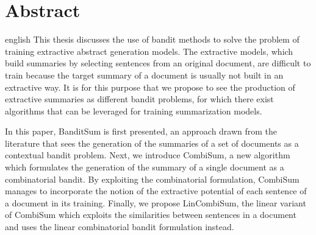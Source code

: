 \chapter*{Abstract}             %
\label{chap:abstract}           %

\begin{otherlanguage*}{english}
This thesis discusses the use of bandit methods to solve 
the problem of training extractive abstract generation models.
The extractive models, which build summaries by selecting sentences from an 
original document, are difficult to train because the target summary of a document is usually not built in an extractive way.
It is for this purpose that we propose to see the production of extractive summaries
as different bandit problems, for which there exist algorithms that can be leveraged for training summarization models.

In this paper, BanditSum is first presented, an approach drawn from 
the literature that sees the generation of the summaries 
of a set of documents as a contextual bandit problem.
Next, we introduce CombiSum, a new algorithm 
which formulates the generation of the summary of a 
single document as a combinatorial bandit.
By exploiting the combinatorial formulation,
CombiSum manages to incorporate the notion of the extractive potential 
of each sentence of a document in its training.
Finally, we propose LinCombiSum, the linear variant of CombiSum 
which exploits the similarities between sentences in a document 
and uses the linear combinatorial bandit formulation instead.
 
\end{otherlanguage*}
